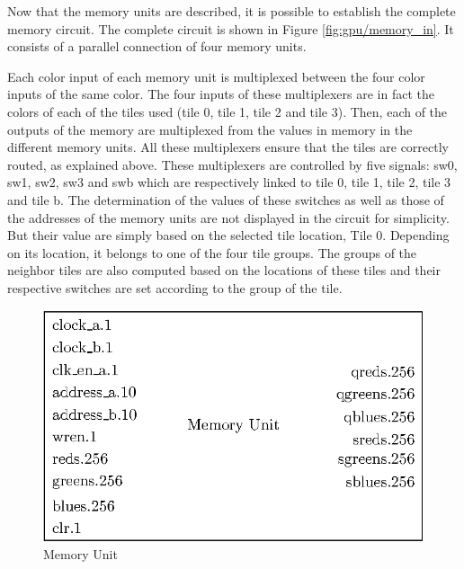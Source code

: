Now that the memory units are described, it is possible to establish the complete memory circuit.
The complete circuit is shown in Figure \ref{fig:gpu/memory_in}. It consists of a parallel 
connection of four memory units. 

Each color input of each memory unit is multiplexed between the four color inputs of the same color. 
The four inputs of these multiplexers are in fact the colors of each of the 
tiles used (tile 0, tile 1, tile 2 and tile 3). Then, each of the outputs of the memory are 
multiplexed from the values in memory in the different memory units. All these multiplexers ensure 
that the tiles are correctly routed, as explained above. These multiplexers are controlled by five 
signals: sw0, sw1, sw2, sw3 and swb which are respectively linked to tile 0, tile 1, tile 2, tile 3 
and tile b. The determination of the values of these switches as well as those of the addresses of 
the memory units are not displayed in the circuit for simplicity. But their
value are simply based on the selected tile location, Tile 0. Depending on its location, it belongs 
to one of the four tile groups. The groups of the neighbor tiles are also computed based on the 
locations of these tiles and their respective switches are set according to the group of the tile. 

\begin{figure}[H]
    \centering
    \includegraphics[scale=1.0]{Chapter4-GPU_CLKU/res/memory_unit}
    \caption{Memory Unit}
    \label{fig:gpu/memory_unit}
\end{figure}


